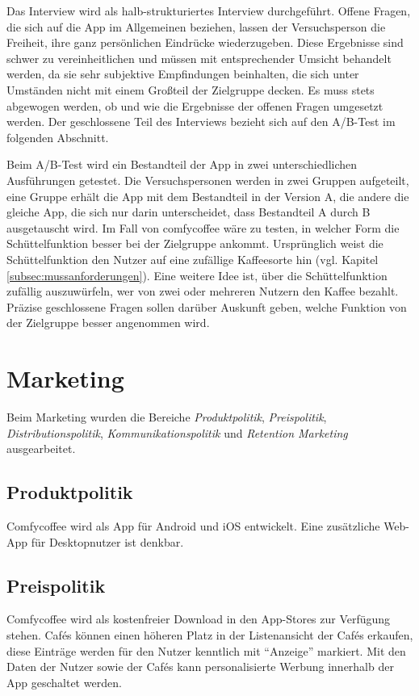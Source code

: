 Das Interview wird als halb-strukturiertes Interview durchgeführt. Offene Fragen, die sich auf die App im Allgemeinen beziehen, lassen der Versuchsperson die Freiheit, ihre ganz persönlichen Eindrücke wiederzugeben. Diese Ergebnisse sind schwer zu vereinheitlichen und müssen mit entsprechender Umsicht behandelt werden, da sie sehr subjektive Empfindungen beinhalten, die sich unter Umständen nicht mit einem Großteil der Zielgruppe decken. Es muss stets abgewogen werden, ob und wie die Ergebnisse der offenen Fragen umgesetzt werden. Der geschlossene Teil des Interviews bezieht sich auf den A/B-Test im folgenden Abschnitt.

Beim A/B-Test wird ein Bestandteil der App in zwei unterschiedlichen Ausführungen getestet. Die Versuchspersonen werden in zwei Gruppen aufgeteilt, eine Gruppe erhält die App mit dem Bestandteil in der Version A, die andere die gleiche App, die sich nur darin unterscheidet, dass Bestandteil A durch B ausgetauscht wird. Im Fall von comfycoffee wäre zu testen, in welcher Form die Schüttelfunktion besser bei der Zielgruppe ankommt. Ursprünglich weist die Schüttelfunktion den Nutzer auf eine zufällige Kaffeesorte hin (vgl. Kapitel \ref{subsec:mussanforderungen}). Eine weitere Idee ist, über die Schüttelfunktion zufällig auszuwürfeln, wer von zwei oder mehreren Nutzern den Kaffee bezahlt. Präzise geschlossene Fragen sollen darüber Auskunft geben, welche Funktion von der Zielgruppe besser angenommen wird.

\section{Marketing}
\label{sec:marketing}
Beim Marketing wurden die Bereiche \emph{Produktpolitik}, \emph{Preispolitik}, \emph{Distributionspolitik}, \emph{Kommunikationspolitik} und \emph{Retention Marketing} ausgearbeitet.

\subsection{Produktpolitik}
Comfycoffee wird als App für Android und iOS entwickelt. Eine zusätzliche Web-App für Desktopnutzer ist denkbar.

\subsection{Preispolitik}
Comfycoffee wird als kostenfreier Download in den App-Stores zur Verfügung stehen. Cafés können einen höheren Platz in der Listenansicht der Cafés erkaufen, diese Einträge werden für den Nutzer kenntlich mit ``Anzeige'' markiert. Mit den Daten der Nutzer sowie der Cafés kann personalisierte Werbung innerhalb der App geschaltet werden.

